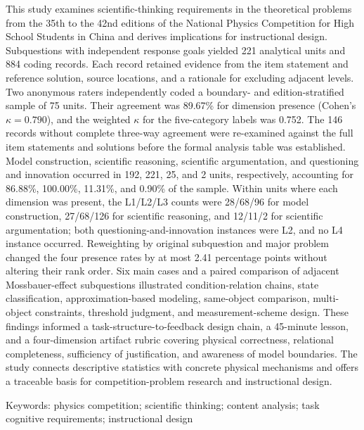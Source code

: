 \documentclass[
  12pt,
  a4paper,twoside,openany]{ctexbook}
\begin{document}
This study examines scientific-thinking requirements in the theoretical
problems from the 35th to the 42nd editions of the National Physics
Competition for High School Students in China and derives implications
for instructional design. Subquestions with independent response goals
yielded 221 analytical units and 884 coding records. Each record
retained evidence from the item statement and reference solution, source
locations, and a rationale for excluding adjacent levels. Two anonymous
raters independently coded a boundary- and edition-stratified sample of
75 units. Their agreement was 89.67\% for dimension presence (Cohen's
\(\kappa=0.790\)), and the weighted \(\kappa\) for the five-category
labels was 0.752. The 146 records without complete three-way agreement
were re-examined against the full item statements and solutions before
the formal analysis table was established. Model construction,
scientific reasoning, scientific argumentation, and questioning and
innovation occurred in 192, 221, 25, and 2 units, respectively,
accounting for 86.88\%, 100.00\%, 11.31\%, and 0.90\% of the sample.
Within units where each dimension was present, the L1/L2/L3 counts were
28/68/96 for model construction, 27/68/126 for scientific reasoning, and
12/11/2 for scientific argumentation; both questioning-and-innovation
instances were L2, and no L4 instance occurred. Reweighting by original
subquestion and major problem changed the four presence rates by at most
2.41 percentage points without altering their rank order. Six main cases
and a paired comparison of adjacent Mossbauer-effect subquestions
illustrated condition-relation chains, state classification,
approximation-based modeling, same-object comparison, multi-object
constraints, threshold judgment, and measurement-scheme design. These
findings informed a task-structure-to-feedback design chain, a 45-minute
lesson, and a four-dimension artifact rubric covering physical
correctness, relational completeness, sufficiency of justification, and
awareness of model boundaries. The study connects descriptive statistics
with concrete physical mechanisms and offers a traceable basis for
competition-problem research and instructional design.

Keywords: physics competition; scientific thinking; content analysis;
task cognitive requirements; instructional design


\endgroup
\clearpage
\setcounter{tocdepth}{2}
\tableofcontents
\clearpage
{}
{}
\listoffigures
\clearpage
{}
{}
\listoftables
\mainmatter
{}
\end{document}

